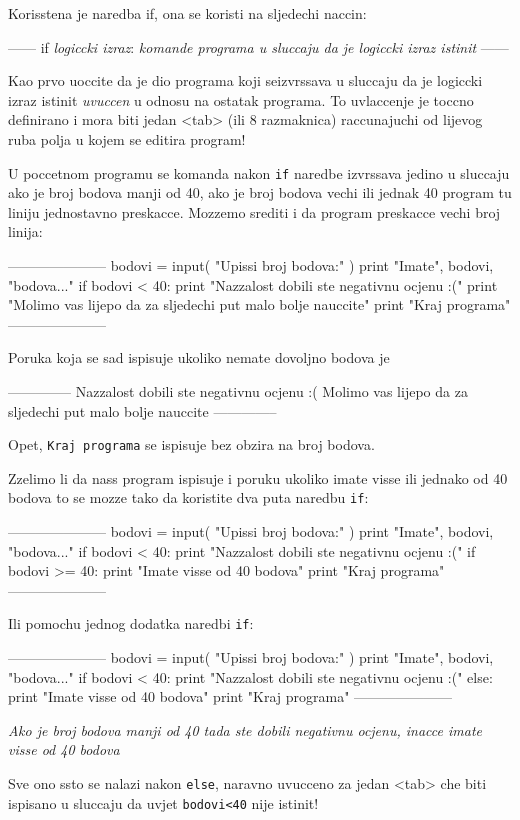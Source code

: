 Korisstena je naredba if, ona se koristi na sljedechi naccin:

------
if \emph{logiccki izraz}:
	\emph{komande programa u sluccaju da je logiccki izraz istinit}
------

Kao prvo uoccite da je dio programa koji seizvrssava u sluccaju da
je logiccki izraz istinit \emph{uvuccen} u odnosu na ostatak
programa. To uvlaccenje je toccno definirano i mora biti jedan
<tab> (ili 8 razmaknica) raccunajuchi od lijevog ruba polja u kojem se
editira program!

U poccetnom programu se komanda nakon \verb"if" naredbe izvrssava
jedino u sluccaju ako je broj bodova manji od 40, ako je broj bodova
vechi ili jednak 40 program tu liniju jednostavno preskacce. Mozzemo
srediti i da program preskacce vechi broj linija:

---------------------
bodovi = input( "Upissi broj bodova:" )
print "Imate", bodovi, "bodova..."
if bodovi < 40:
	print "Nazzalost dobili ste negativnu ocjenu :("
	print "Molimo vas lijepo da za sljedechi put malo bolje nauccite"
print "Kraj programa"
---------------------

Poruka koja se sad ispisuje ukoliko nemate dovoljno bodova je 

--------------
Nazzalost dobili ste negativnu ocjenu :(
Molimo vas lijepo da za sljedechi put malo bolje nauccite
--------------

Opet, \verb"Kraj programa" se ispisuje bez obzira na broj bodova.

Zzelimo li da nass program ispisuje i poruku ukoliko imate visse ili jednako od 40 bodova to se mozze
tako da koristite dva puta naredbu \verb"if":

---------------------
bodovi = input( "Upissi broj bodova:" )
print "Imate", bodovi, "bodova..."
if bodovi < 40:
	print "Nazzalost dobili ste negativnu ocjenu :("
if bodovi >= 40:
	print "Imate visse od 40 bodova"
print "Kraj programa"
---------------------

Ili pomochu jednog dodatka naredbi \verb"if":

---------------------
bodovi = input( "Upissi broj bodova:" )
print "Imate", bodovi, "bodova..."
if bodovi < 40:
	print "Nazzalost dobili ste negativnu ocjenu :("
else:
	print "Imate visse od 40 bodova"
print "Kraj programa"
---------------------

\emph{Ako je broj bodova manji od 40 tada ste dobili negativnu
ocjenu, inacce imate visse od 40 bodova}

Sve ono ssto se nalazi nakon \verb"else", naravno uvucceno za jedan
<tab> che biti ispisano u sluccaju da uvjet \verb"bodovi<40" nije
istinit!

